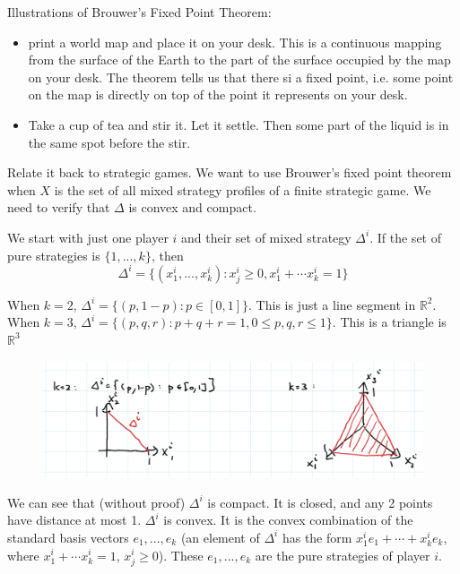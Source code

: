 \documentclass[twoside]{article}
\begin{document}
Illustrations of Brouwer's Fixed Point Theorem: \begin{itemize}
\item print a world map and place it on your desk. This is a continuous mapping from the surface of the Earth to the part of the surface occupied by the map on your desk. The theorem tells us that there si a fixed point, i.e. some point on the map is directly on top of the point it represents on your desk. 
\item Take a cup of tea and stir it. Let it settle. Then some part of the liquid is in the same spot before the stir. 
\end{itemize}

Relate it back to strategic games. We want to use Brouwer's fixed point theorem when $X$ is the set of all mixed strategy profiles of a finite strategic game. We need to verify that $\Delta$ is convex and compact. 

We start with just one player $i$ and their set of mixed strategy $\Delta^i$. If the set of pure strategies is $\{1, ..., k\}$, then $$\Delta^i = \{(x_1^i, ..., x_k^i) : x_j^i \geq 0, x_1^i + \cdots x_k^i = 1\}$$

When $k = 2$, $\Delta^i = \{(p, 1-p) : p \in [0, 1]\}$. This is just a line segment in $\mathbb{R}^2$. When $k = 3$, $\Delta^i = \{(p, q, r) : p+q+r = 1, 0 \leq p, q, r \leq 1\}$. This is a triangle is $ \mathbb{R}^3$
\begin{center}
	\begin{figure}[h!]
		\includegraphics[width=\linewidth]{Delta_is_convex_and_compact.png}
	\end{figure}
\end{center}

We can see that (without proof) $\Delta^i$ is compact. It is closed, and any 2 points have distance at most 1. $\Delta^i$ is convex. It is the convex combination of the standard basis vectors $e_1, ..., e_k$ (an element of $\Delta^i$ has the form $x_1^ie_1 + \cdots + x_k^ie_k$, where $x_1^i + \cdots x_k^i = 1$, $x_j^i \geq 0$). These $e_1, ..., e_k$ are the pure strategies of player $i$. 
\end{document}
